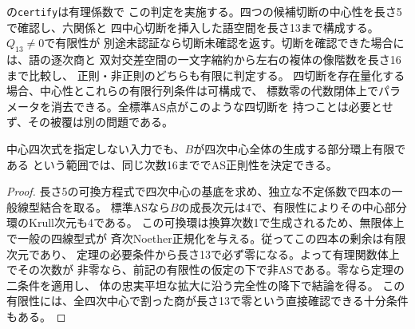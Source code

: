 の\texttt{certify}は有理係数で
この判定を実施する。四つの候補切断の中心性を長さ5で確認し、六関係と
四中心切断を挿入した語空間を長さ13まで構成する。$Q_{13}\ne0$で有限性が
別途未認証なら切断未確認を返す。切断を確認できた場合には、語の逐次商と
双対交差空間の一文字縮約から左右の複体の像階数を長さ16まで比較し、
正則・非正則のどちらも有限に判定する。
四切断を存在量化する場合、中心性とこれらの有限行列条件は可構成で、
標数零の代数閉体上でパラメータを消去できる。全標準AS点がこのような四切断を
持つことは必要とせず、その被覆は別の問題である。

\begin{corollary}
中心四次式を指定しない入力でも、$B$が四次中心全体の生成する部分環上有限である
という範囲では、同じ次数16まででAS正則性を決定できる。
\end{corollary}
\begin{proof}
長さ5の可換方程式で四次中心の基底を求め、独立な不定係数で四本の一般線型結合を取る。
標準ASなら$B$の成長次元は4で、有限性によりその中心部分環のKrull次元も4である。
この可換環は換算次数1で生成されるため、無限体上で一般の四線型式が
斉次Noether正規化を与える。従ってこの四本の剰余は有限次元であり、
定理の必要条件から長さ13で必ず零になる。よって有理関数体上でその次数が
非零なら、前記の有限性の仮定の下で非ASである。零なら定理の二条件を適用し、
体の忠実平坦な拡大に沿う完全性の降下で結論を得る。
この有限性には、全四次中心で割った商が長さ13で零という直接確認できる十分条件もある。
\end{proof}
